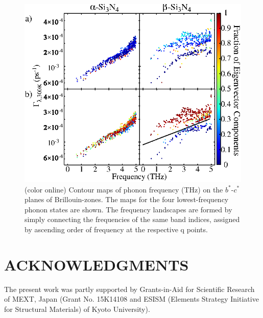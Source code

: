 \documentclass[twocolumn,amsmath,amssymb,a4paper,prb,superscriptaddress,floatfix]{revtex4-1}
\begin{document}
\begin{figure}[ht]
 \centering
  \includegraphics[width=\linewidth]{figure_analyze_gamma3.eps} \caption{(color
  online) Contour maps of phonon frequency (THz) on the $b^*$-$c^*$
  planes of Brillouin-zones. The maps for the four lowest-frequency
  phonon states are shown. The frequency landscapes are formed by simply
  connecting the frequencies of the same band indices, assigned by
  ascending order of frequency at the respective q
  points. \label{fig:Fig7_338} }
 \centering
\end{figure}

\section*{ACKNOWLEDGMENTS}
The present work was partly supported by Grants-in-Aid for Scientific
Research of MEXT, Japan (Grant No. 15K14108 and ESISM (Elements Strategy
Initiative for Structural Materials) of Kyoto University).

\appendix
\end{document}
